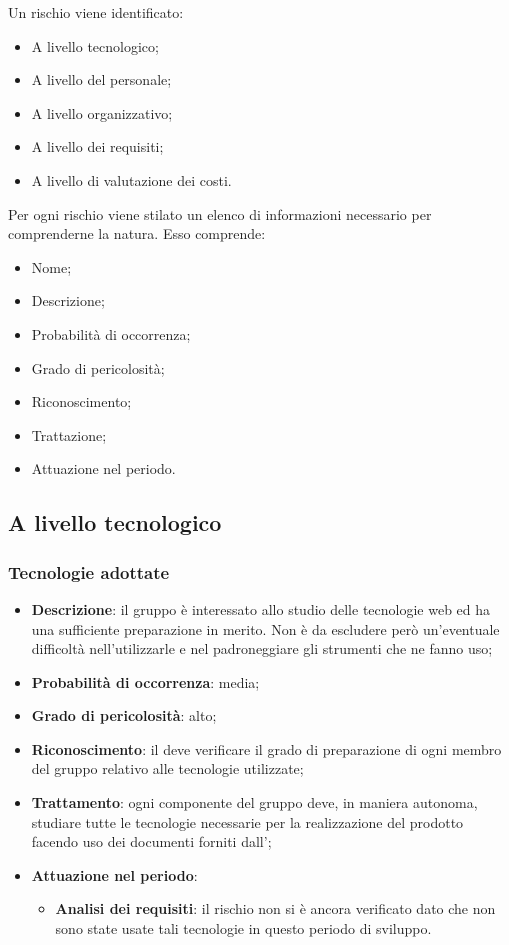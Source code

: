 	Un rischio viene identificato: 
	
	\begin{itemize}
		\item A livello tecnologico; 
		\item A livello del personale;
		\item A livello organizzativo;
		\item A livello dei requisiti;
		\item A livello di valutazione dei costi.
	\end{itemize}
	
	Per ogni rischio viene stilato un elenco di informazioni necessario per comprenderne la natura. Esso comprende: 
	
	\begin{itemize}
		\item Nome; 
		\item Descrizione;
		\item Probabilità di occorrenza;
		\item Grado di pericolosità;
		\item Riconoscimento;
		\item Trattazione;
		\item Attuazione nel periodo.
	\end{itemize}

	\subsection{A livello tecnologico}
	
		\subsubsection{Tecnologie adottate}
		\begin{itemize}
			\item \textbf{Descrizione}: il gruppo è interessato allo studio delle tecnologie web ed ha una sufficiente preparazione in merito. Non è da escludere però un'eventuale difficoltà nell'utilizzarle e nel padroneggiare gli strumenti che ne fanno uso;
			\item \textbf{Probabilità di occorrenza}: media;
			\item \textbf{Grado di pericolosità}: alto;
			\item \textbf{Riconoscimento}: il \textit{\Res} deve verificare il grado di preparazione di ogni membro del gruppo relativo alle tecnologie utilizzate;	
			\item \textbf{Trattamento}: ogni componente del gruppo deve, in maniera autonoma, studiare tutte le tecnologie necessarie per la realizzazione del prodotto facendo uso dei documenti forniti dall'\textit{\Amm};
			\item \textbf{Attuazione nel periodo}:
				\begin{itemize}
					\item \textbf{Analisi dei requisiti}: il rischio non si è ancora verificato dato che non sono state usate tali tecnologie in questo periodo di sviluppo.
				\end{itemize}
		\end{itemize}
		
